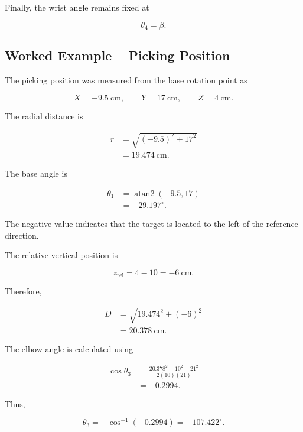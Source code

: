 Finally, the wrist angle remains fixed at

\begin{equation}
\theta_4=\beta.
\label{eq:theta4}
\end{equation}

\subsection{Worked Example -- Picking Position}

The picking position was measured from the base rotation point as

\begin{equation}
X=-9.5~\mathrm{cm},
\qquad
Y=17~\mathrm{cm},
\qquad
Z=4~\mathrm{cm}.
\end{equation}

The radial distance is

\begin{align}
r
&= \sqrt{(-9.5)^2+17^2}\\
&=19.474~\mathrm{cm}.
\end{align}

The base angle is

\begin{align}
\theta_1
&=\operatorname{atan2}(-9.5,17)\\
&=-29.197^\circ.
\end{align}

The negative value indicates that the target is located to the left of the reference direction.

The relative vertical position is

\begin{equation}
z_{\mathrm{rel}}=4-10=-6~\mathrm{cm}.
\end{equation}

Therefore,

\begin{align}
D
&=\sqrt{19.474^2+(-6)^2}\\
&=20.378~\mathrm{cm}.
\end{align}

The elbow angle is calculated using

\begin{align}
\cos\theta_3
&=
\frac{20.378^2-10^2-21^2}
{2(10)(21)}\\
&=-0.2994.
\end{align}

Thus,

\begin{equation}
\theta_3
=
-\cos^{-1}(-0.2994)
=
-107.422^\circ.
\end{equation}

